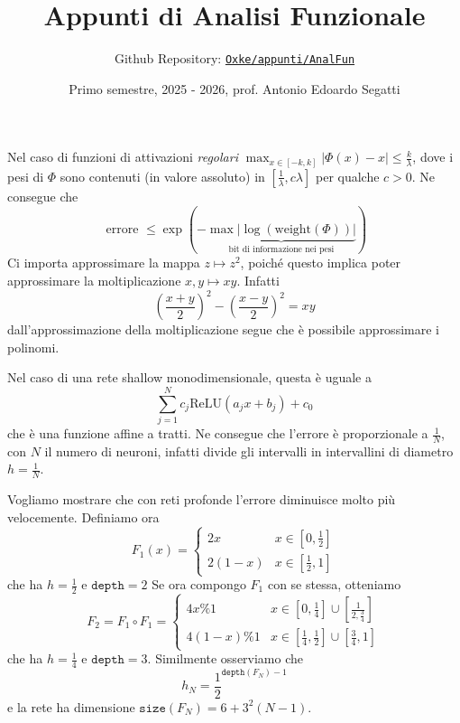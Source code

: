

\title{Appunti di Analisi Funzionale}
\author{Github Repository:
\href{https://github.com/Oxke/appunti/tree/main/AnalFun}{\texttt{Oxke/appunti/AnalFun}}}
\date{Primo semestre, 2025 \-- 2026, prof. Antonio Edoardo Segatti}



\maketitle



Nel caso di funzioni di attivazioni \emph{regolari} \(\max_{x \in [-k, k]} |
\Phi {(x)} - x | \le \frac{k}{\lambda}\), dove i pesi di \(\Phi\) sono contenuti
(in valore assoluto) in \([\frac{1}{\lambda}, c\lambda]\) per qualche \(c > 0\).
Ne consegue che 
\[
    \text{ errore } \le \exp {( - \underbrace{\max \left|\log {(\text{weight}
    {(\Phi)})}\right|}_{\text{bit di informazione nei pesi}})}
\]
Ci importa approssimare la mappa \(z \mapsto z^2\), poiché questo implica poter
approssimare la moltiplicazione \(x,y \mapsto xy\). Infatti
\[
  {\left( \frac{x+y}{2} \right)}^2 - {\left( \frac{x-y}{2} \right)}^2 = xy
\]
dall'approssimazione della moltiplicazione segue che è possibile approssimare i
polinomi.

Nel caso di una rete shallow monodimensionale, questa è uguale a 
\[
  \sum_{j=1}^{N} c_{j} \mathrm{ReLU}{(a_{j} x + b_{j})} + c_{0} 
\]
che è una funzione affine a tratti. Ne consegue che l'errore è proporzionale a
\(\frac{1}{N}\), con \(N\) il numero di neuroni, infatti divide gli intervalli
in intervallini di diametro \(h = \frac{1}{N}\).

Vogliamo mostrare che con reti profonde l'errore diminuisce molto più
velocemente.
Definiamo ora 
\[
  F_{1}{(x)} = \begin{cases}{}
      2x & x \in [0, \frac{1}{2}] \\
      2(1-x) & x \in [\frac{1}{2}, 1]
  \end{cases}
\]
che ha \(h = \frac{1}{2}\) e \(\mathtt{depth} = 2\) 
Se ora compongo \(F_{1}\) con se stessa, otteniamo
\[F_{2} = F_{1} \circ F_{1} = \begin{cases}{}
    4x \% 1 & x \in  [0, \frac{1}{4}] \cup [\frac{1}{2, \frac{3}{4}}]
    \\
    4(1-x) \% 1 & x \in [\frac{1}{4}, \frac{1}{2}] \cup [\frac{3}{4}, 1]
\end{cases}
 \]
 che ha \(h = \frac{1}{4}\) e \(\mathtt{depth} = 3\). Similmente osserviamo che
 \[
   h_N = \frac{1}{2}^{\mathtt{depth} {(F_N)} - 1}
 \]
 e la rete ha dimensione \(\mathtt{size}{(F_N)} = 6 + 3^2 {( N - 1)}\).

